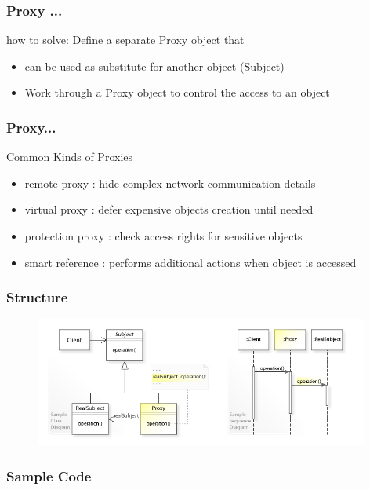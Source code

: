 \documentclass{beamer}
\begin{document}
\begin{frame}[fragile]
\frametitle{Proxy ...}

\begin{block}{how to solve:}
Define a separate Proxy object that
\begin{itemize}
\item can be used as substitute for another object (Subject)
\item Work through a Proxy object to control the access to an object
\end{itemize}
\end{block}

\end{frame}



\begin{frame}[fragile]
\frametitle{Proxy...}
\begin{block}{Common Kinds of Proxies}
\begin{itemize}
\item remote proxy  : hide complex network communication details
\item virtual proxy : defer expensive objects creation until needed
\item protection proxy : check access rights for sensitive objects
\item smart reference : performs additional actions when object is accessed
\end{itemize}
\end{block}

\end{frame}

\begin{frame}[fragile]
\frametitle{Structure}

 \begin{figure}[ht]
       \includegraphics[width=11cm]{./images/proxy.jpg}
 \end{figure}

\end{frame}




\begin{frame}[fragile]
\frametitle{Sample Code}

\end{frame}
\end{document}
